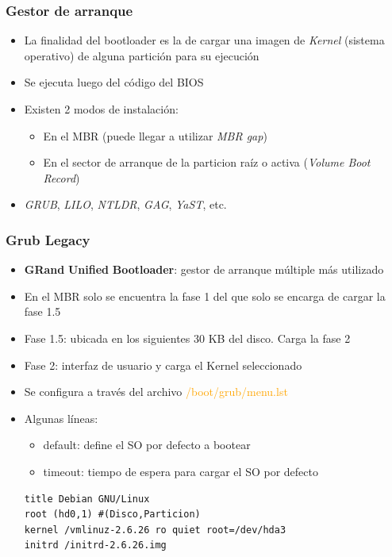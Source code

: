 \begin{frame}
	\frametitle{Gestor de arranque}
	\begin{itemize}
		\item La finalidad del bootloader es la de cargar una imagen de \textit{Kernel} (sistema operativo) de alguna partición para su ejecución
		\item Se ejecuta luego del código del BIOS		
		\item Existen 2 modos de instalación:
		\begin{itemize}
			\item En el MBR (puede llegar a utilizar \textit{MBR gap})
			\item En el sector de arranque de la particion raíz o activa (\textit{Volume Boot Record})
		\end{itemize}
		\item \emph{GRUB}, \emph{LILO}, \emph{NTLDR}, \emph{GAG}, \emph{YaST}, etc.
	\end{itemize}
\end{frame}

\begin{frame}[fragile]
	\frametitle{Grub Legacy}
	\begin{itemize}
		\item \textbf{GRand} \textbf{Unified} \textbf{Bootloader}: gestor de arranque múltiple más utilizado
		\item En el MBR solo se encuentra la fase 1 del que solo se encarga de cargar la fase 1.5
		\item Fase 1.5: ubicada en los siguientes 30 KB del disco. Carga la fase 2
		\item Fase 2: interfaz de usuario y carga el Kernel seleccionado
		\item Se configura a través del archivo \textcolor{orange}{/boot/grub/menu.lst}
		\item Algunas líneas:
		\begin{itemize}
			\item default: define el SO por defecto a bootear
			\item timeout: tiempo de espera para cargar el SO por defecto
		\end{itemize}
		\begin{lstlisting}
title Debian GNU/Linux
root (hd0,1) #(Disco,Particion)
kernel /vmlinuz-2.6.26 ro quiet root=/dev/hda3
initrd /initrd-2.6.26.img
		\end{lstlisting}		
	\end{itemize}
\end{frame}

